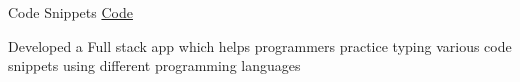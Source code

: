 

\begin{cventries}

  \projectentry
    {Code Snippets} %
    {\href{https://github.com/Samxx97/Code-Snippets}{\faGithub\acvHeaderIconSep\@Source Code}} %
    {
      \begin{cvitems} %
        \item {Developed a Full stack app which helps programmers practice typing various code snippets using different programming languages}
      \end{cvitems}
    }

\end{cventries}

